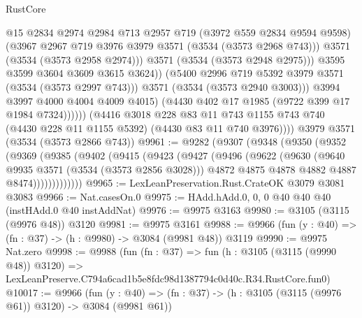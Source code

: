 \begin{lexlean}{RustCore}
\begin{coremodule}
                            @15
                            @2834
                            @2974
                            @2984
                            @713
                            @2957
                            @719
                            (@3972 @559 @2834 @9594 @9598)
                            (@3967 @2967 @719 @3976 @3979 @3571 (@3534 (@3573 @2968 @743)))
                            @3571
                            (@3534 (@3573 @2958 @2974)))
                          @3571
                          (@3534 (@3573 @2948 @2975)))
                        @3595
                        @3599
                        @3604
                        @3609
                        @3615
                        @3624))
                    (@5400 @2996 @719 @5392 @3979 @3571 (@3534 (@3573 @2997 @743)))
                    @3571
                    (@3534 (@3573 @2940 @3003)))
                  @3994
                  @3997
                  @4000
                  @4004
                  @4009
                  @4015)
                (@4430 @402 @17 @1985 (@9722 @399 @17 @1984 @7324))))))
        (@4416
          @3018
          @228
          @83
          @11
          @743
          @1155
          @743
          @740
          (@4430 @228 @11 @1155 @5392)
          (@4430 @83 @11 @740 @3976))))
    @3979
    @3571
    (@3534 (@3573 @2866 @743))
@9961 := @9282
    (@9307
      (@9348
        (@9350
          (@9352
            (@9369
              (@9385
                (@9402
                  (@9415
                    (@9423
                      (@9427
                        (@9496
                          (@9622
                            (@9630
                              (@9640 @9935 @3571 (@3534 (@3573 @2856 @3028)))
                              @4872
                              @4875
                              @4878
                              @4882
                              @4887
                              @8474)))))))))))))
@9965 := LexLeanPreservation.Rust.CrateOK @3079 @3081 @3083
@9966 := Nat.casesOn.{0}
@9975 := HAdd.hAdd.{0, 0, 0} @40 @40 @40 (instHAdd.{0} @40 instAddNat)
@9976 := @9975 @3163
@9980 := @3105 (@3115 (@9976 @48)) @3120
@9981 := @9975 @3161
@9988 := @9966 (fun (y : @40) => (fn : @37) -> (h : @9980) -> @3084 (@9981 @48)) @3119
@9990 := @9975 Nat.zero
@9998 := @9988
    (fun (fn : @37) =>
    fun (h : @3105 (@3115 (@9990 @48)) @3120) =>
    LexLeanPreserve.C794a6cad1b5e8fdc98d1387794c0d40c.R34.RustCore.fun0)
@10017 := @9966
    (fun (y : @40) => (fn : @37) -> (h : @3105 (@3115 (@9976 @61)) @3120) -> @3084 (@9981 @61))

\end{coremodule}
\end{lexlean}
